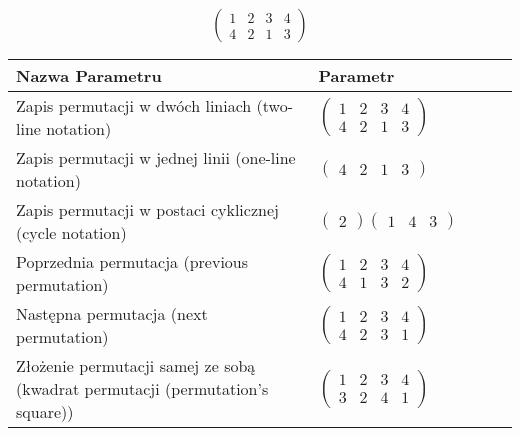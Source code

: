 \documentclass[12pt]{article}
\begin{document}
\subsection{}
\begin{center}
\[
\begin{pmatrix}
	1 & 2 & 3 & 4 \\ 
	4 & 2 & 1 & 3 
\end{pmatrix}
\]

\begin{tabular}{|m{0.6\linewidth}|m{0.4\linewidth}|}
	\hline
	Nazwa Parametru & Parametr \\
	\hline
	Zapis permutacji w dwóch liniach (two-line notation) & $\begin{pmatrix} 1 & 2 & 3 & 4 \\ 
4 & 2 & 1 & 3 \end{pmatrix}$ \\ 
	\hline
	Zapis permutacji w jednej linii (one-line notation) & $\begin{pmatrix} 4 & 2 & 1 & 3 \end{pmatrix}$ \\ 
	\hline
	Zapis permutacji w postaci cyklicznej (cycle notation) & $\begin{pmatrix} 2 \end{pmatrix} \begin{pmatrix} 1 & 4 & 3 \end{pmatrix} $ \\ 
	\hline
	Poprzednia permutacja (previous permutation) & $\begin{pmatrix} 1 & 2 & 3 & 4 \\ 
4 & 1 & 3 & 2 \end{pmatrix}$ \\ 
	\hline
	Następna permutacja (next permutation) & $\begin{pmatrix} 1 & 2 & 3 & 4 \\ 
4 & 2 & 3 & 1 \end{pmatrix}$ \\ 
	\hline
	Złożenie permutacji samej ze sobą (kwadrat permutacji (permutation's square)) & $\begin{pmatrix} 1 & 2 & 3 & 4 \\ 
3 & 2 & 4 & 1 \end{pmatrix}$ \\ 
	\hline
\end{tabular}
\end{center}
\end{document}
